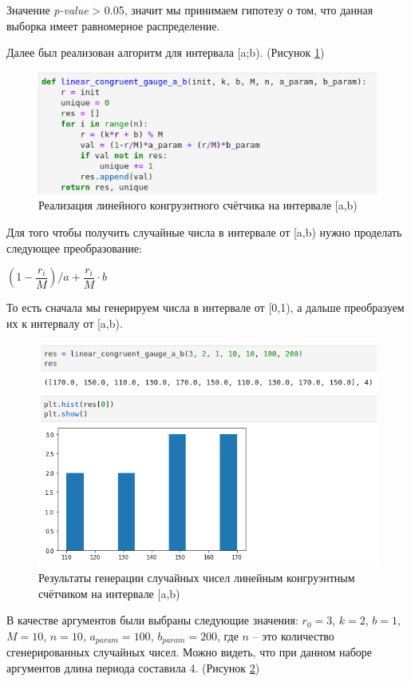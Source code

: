 \documentclass[14pt,fleqn]{extarticle}
\begin{document}
    Значение \textit{p-value} > 0.05, значит мы принимаем гипотезу о том, что данная выборка имеет равномерное распределение.
    
    \newpage
    Далее был реализован алгоритм для интервала [a;b). (Рисунок \ref{fig:linear_congruent_gauge_a_b_code})
    \begin{figure}[h]
        \centering \includegraphics[scale=0.6]{linear_congruent_gauge_a_b_code}
        \caption{Реализация линейного конгруэнтного счётчика на интервале [a,b)}
        \label{fig:linear_congruent_gauge_a_b_code}
    \end{figure}

	Для того чтобы получить случайные числа в интервале от [a,b) нужно проделать следующее преобразование:
	\begin{center}
		$(1 - \dfrac{r_i}{M})/a + \dfrac{r_i}{M} \cdot b$
	\end{center}
	То есть сначала мы генерируем числа в интервале от [0,1), а дальше преобразуем их к интервалу от [a,b).
 	\begin{figure}[h]
		\centering \includegraphics[scale=0.52]{linear_congruent_gauge_a_b_result}
		\caption{Результаты генерации случайных чисел линейным конгруэнтным счётчиком на интервале [a,b)}
		\label{fig:linear_congruent_gauge_a_b_result}
	\end{figure}
    \newpage
	В качестве аргументов были выбраны следующие значения: $r_0 = 3$, $k = 2$, $b = 1$, $M = 10$, $n = 10$, $a_{param} = 100$, $b_{param} = 200$, где $n$ -- это количество сгенерированных случайных чисел. Можно видеть, что при данном наборе аргументов длина периода составила 4. (Рисунок \ref{fig:linear_congruent_gauge_a_b_result})\\
\end{document}
